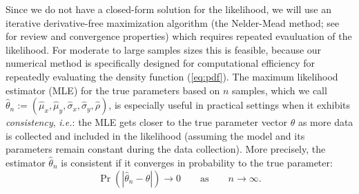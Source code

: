 \documentclass[10pt]{article}
\begin{document}
Since we do not have a closed-form solution for the likelihood, we
will use an iterative derivative-free maximization algorithm (the
Nelder-Mead method; see \cite{lagarias1998convergence} for review and
convergence properties) which requires repeated evauluation of the
likelihood. For moderate to large samples sizes this is feasible,
because our numerical method is specifically designed for
computational efficiency for repeatedly evaluating the density
function (\ref{eq:pdf}). The maximum likelihood estimator (MLE) for
the true parameters based on $n$ samples, which we call
$\hat{\theta}_n := (\hat{\mu}_x, \hat{\mu}_y, \hat{\sigma}_x,
\hat{\sigma}_y, \hat{\rho})$, is especially useful in practical
settings when it exhibits \textit{consistency}, \textit{i.e.}: the MLE
gets closer to the true parameter vector $\theta$ as more data is
collected and included in the likelihood (assuming the model and its
parameters remain constant during the data collection). More
precisely, the estimator $\hat{\theta}_n$ is consistent if it
converges in probability to the true parameter:
\[
  \Pr( | \hat{\theta}_n - \theta | ) \to 0 \qquad \mbox{as} \qquad n \to \infty.
\]
\end{document}
